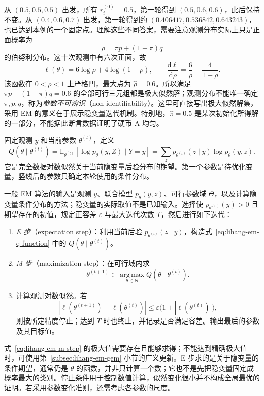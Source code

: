 \begin{solve}
从 $(0.5,0.5,0.5)$ 出发，所有 $r_i^{(0)}=0.5$，第一轮得到 $(0.5,0.6,0.6)$，此后保持不变。从 $(0.4,0.6,0.7)$ 出发，第一轮得到约 $(0.406417,0.536842,0.643243)$，也已达到本例的一个固定点。理解这些不同答案，需要注意观测分布实际上只是正面概率为
\[
  \rho=\pi p+(1-\pi)q
\]
的伯努利分布。这十次观测中有六次正面，故
\[
  \ell(\theta)=6\log\rho+4\log(1-\rho),\qquad
  \frac{\mathrm d\ell}{\mathrm d\rho}=\frac6\rho-\frac4{1-\rho}.
\]
该函数在 $0<\rho<1$ 上严格凹，最大点为 $\widehat\rho=0.6$。所以满足 $\pi p+(1-\pi)q=0.6$ 的全部可行三元组都是极大似然解；观测分布不能唯一确定 $\pi,p,q$，称为\emph{参数不可辨识}（non-identifiability）。这里可直接写出极大似然解集，采用 EM 的意义在于展示隐变量迭代机制。特别地，$\widehat\pi=0.5$ 是某次初始化所得解的一部分，不能据此断言数据证明了硬币 A 均匀。
\end{solve}

\begin{definition}[$Q$ 函数]
\label{def:lihang-em-q-function}
固定观测 $y$ 和当前参数 $\theta^{(t)}$，定义
\begin{equation}
  Q(\theta\mid\theta^{(t)})
  =\mathbb E_{\theta^{(t)}}[\log p_\theta(y,Z)\mid Y=y]
  =\sum_z p_{\theta^{(t)}}(z\mid y)\log p_\theta(y,z).
  \label{eq:lihang-em-q-function}
\end{equation}
它是完全数据对数似然关于当前隐变量后验分布的期望。第一个参数是待优化变量，竖线后的参数只确定本轮使用的条件分布。
\end{definition}

一般 EM 算法的输入是观测 $y$、联合模型 $p_\theta(y,z)$、可行参数域 $\Theta$，以及计算隐变量条件分布的方法；隐变量的实际取值不是已知输入。选择使 $p_{\theta^{(0)}}(y)>0$ 且期望存在的初值，规定正容差 $\varepsilon$ 与最大迭代次数 $T$，然后进行如下迭代：
\begin{enumerate}
  \item \emph{E 步}（expectation step）：利用当前后验 $p_{\theta^{(t)}}(z\mid y)$，构造式~\eqref{eq:lihang-em-q-function} 中的 $Q(\theta\mid\theta^{(t)})$。
  \item \emph{M 步}（maximization step）：在可行域内求
  \begin{equation}
    \theta^{(t+1)}\in\operatorname*{arg\,max}_{\theta\in\Theta}
    Q(\theta\mid\theta^{(t)}).
    \label{eq:lihang-em-m-step}
  \end{equation}
  \item 计算观测对数似然。若
  \[
    |\ell(\theta^{(t+1)})-\ell(\theta^{(t)})|
    \leq\varepsilon\bigl(1+|\ell(\theta^{(t)})|\bigr),
  \]
  则按所定精度停止；达到 $T$ 时也终止，并记录是否满足容差。输出最后的参数及其目标值。
\end{enumerate}
式~\eqref{eq:lihang-em-m-step} 的极大值需要存在且能够求得；不能达到精确极大值时，可使用第~\ref{subsec:lihang-em-gem} 小节的广义更新。E 步求的是关于隐变量的条件期望，通常仍是 $\theta$ 的函数，并非只计算一个数；它也不是先把隐变量固定成概率最大的类别。停止条件用于控制数值计算，似然变化很小并不构成全局最优的证明。若采用参数变化准则，还需考虑各参数的尺度。

